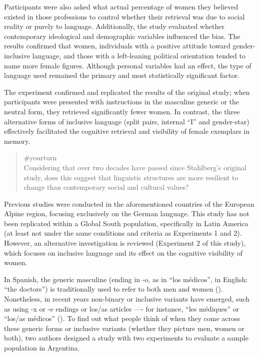 \documentclass[
  letterpaper,
]{book}
\begin{document}
Participants were also asked what actual percentage of women they
believed existed in those professions to control whether their retrieval
was due to social reality or purely to language. Additionally, the study
evaluated whether contemporary ideological and demographic variables
influenced the bias. The results confirmed that women, individuals with
a positive attitude toward gender-inclusive language, and those with a
left-leaning political orientation tended to name more female figures.
Although personal variables had an effect, the type of language used
remained the primary and most statistically significant factor.

The experiment confirmed and replicated the results of the original
study; when participants were presented with instructions in the
masculine generic or the neutral form, they retrieved significantly
fewer women. In contrast, the three alternative forms of inclusive
language (split pairs, internal ``I'' and gender-star) effectively
facilitated the cognitive retrieval and visibility of female exemplars
in memory.

\begin{quote}
{\#yourturn}\\
Considering that over two decades have passed since Stahlberg's original
study, does this suggest that linguistic structures are more resilient
to change than contemporary social and cultural values?
\end{quote}

Previous studies were conducted in the aforementioned countries of the
European Alpine region, focusing exclusively on the German language.
This study has not been replicated within a Global South population,
specifically in Latin America (at least not under the same conditions
and criteria as Experiments 1 and 2). However, an alternative
investigation is reviewed (Experiment 2 of this study), which focuses on
inclusive language and its effect on the cognitive visibility of women.

In Spanish, the generic masculine (ending in -o, as in ``los médicos'',
in English: ``the doctors'') is traditionally used to refer to both men
and women ().
Nonetheless, in recent years non-binary or inclusive variants have
emerged, such as using -x or -e endings or los/as articles ---- for
instance, ``les médiques'' or ``los/as médicos''
(). To find out what people think of when they come across these
generic forms or inclusive variants (whether they picture men, women or
both), two authors designed a study with two experiments to evaluate a
sample population in Argentina.
\end{document}
